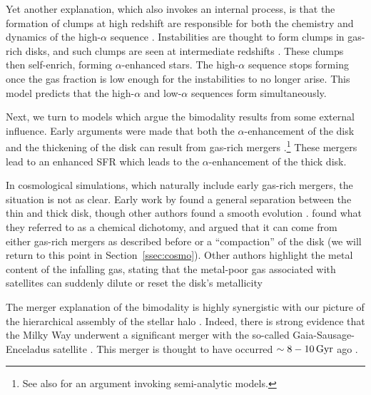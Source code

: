 Yet another explanation, which also invokes an internal process, is that the formation of clumps at high redshift are responsible for both the chemistry and dynamics of the high-$\alpha$ sequence \citep{2019MNRAS.484.3476C,2020MNRAS.492.4716B,2021MNRAS.502..260B,2023ApJ...953..128G}. Instabilities are thought to form clumps in gas-rich disks, and such clumps are seen at intermediate redshifts \citep[$z\sim2$;][]{2005ApJ...627..632E,2007ApJ...658..763E}. These clumps then self-enrich, forming $\alpha$-enhanced stars. The high-$\alpha$ sequence stops forming once the gas fraction is low enough for the instabilities to no longer arise. This model predicts that the high-$\alpha$ and low-$\alpha$ sequences form simultaneously.

Next, we turn to models which argue the bimodality results from some external influence. Early arguments were made that both the $\alpha$-enhancement of the disk and the thickening of the disk can result from gas-rich mergers \citep{2004ApJ...612..894B,2005ApJ...630..298B,2007ApJ...658...60B,2010MNRAS.402.1489R}.\footnote{See also \citet{2009MNRAS.400.1347C} for an argument invoking semi-analytic models.} These mergers lead to an enhanced SFR which leads to the $\alpha$-enhancement of the thick disk.

In cosmological simulations, which naturally include early gas-rich mergers, the situation is not as clear. Early work by \citet{2012MNRAS.426..690B} found a general separation between the thin and thick disk, though other authors found a smooth evolution \citep{2013A&A...558A...9M}. \citet{2018MNRAS.474.3629G} found what they referred to as a chemical dichotomy, and argued that it can come from either gas-rich mergers as described before or a ``compaction'' of the disk (we will return to this point in Section~\ref{ssec:cosmo}). Other authors highlight the metal content of the infalling gas, stating that the metal-poor gas associated with satellites can suddenly dilute or reset the disk's metallicity \citep{2020MNRAS.491.5435B,2024MNRAS.528L.122C}

The merger explanation of the bimodality is highly synergistic with our picture of the hierarchical assembly of the stellar halo \citep{2005ApJ...635..931B}. Indeed, there is strong evidence that the Milky Way underwent a significant merger with the so-called Gaia-Sausage-Enceladus satellite \citep[GSE;][]{2018MNRAS.478..611B,2018Natur.563...85H,2020ApJ...901...48N}. This merger is thought to have occurred $\sim8-10\,\textrm{Gyr}$ ago \citep[see also][]{2020ApJ...897L..18B}.

